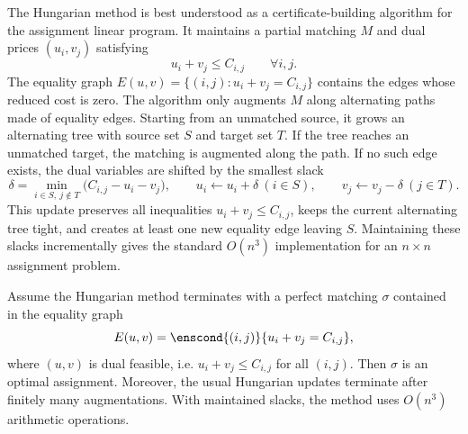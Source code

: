 The Hungarian method is best understood as a certificate-building algorithm for the assignment linear program. It maintains a partial matching $M$ and dual prices $(u_i,v_j)$ satisfying
\[
	u_i+v_j\leq C_{i,j}\qquad\forall i,j.
\]
The equality graph $E(u,v)=\{(i,j):u_i+v_j=C_{i,j}\}$ contains the edges whose reduced cost is zero. The algorithm only augments $M$ along alternating paths made of equality edges. Starting from an unmatched source, it grows an alternating tree with source set $S$ and target set $T$. If the tree reaches an unmatched target, the matching is augmented along the path. If no such edge exists, the dual variables are shifted by the smallest slack
\[
	\delta=\min_{i\in S,\ j\notin T}\bigl(C_{i,j}-u_i-v_j\bigr),
	\qquad
	u_i\leftarrow u_i+\delta\ (i\in S),\qquad
	v_j\leftarrow v_j-\delta\ (j\in T).
\]
This update preserves all inequalities $u_i+v_j\leq C_{i,j}$, keeps the current alternating tree tight, and creates at least one new equality edge leaving $S$. Maintaining these slacks incrementally gives the standard $O(n^3)$ implementation for an $n\times n$ assignment problem.

\begin{prop}\label{prop-hungarian-correct}
	Assume the Hungarian method terminates with a perfect matching $\sigma$ contained in the equality graph
	\[
		E(u,v)=\enscond{(i,j)}{u_i+v_j=C_{i,j}},
	\]
	where $(u,v)$ is dual feasible, i.e. $u_i+v_j\leq C_{i,j}$ for all $(i,j)$. Then $\sigma$ is an optimal assignment. Moreover, the usual Hungarian updates terminate after finitely many augmentations.
	With maintained slacks, the method uses $O(n^3)$ arithmetic operations.
\end{prop}

